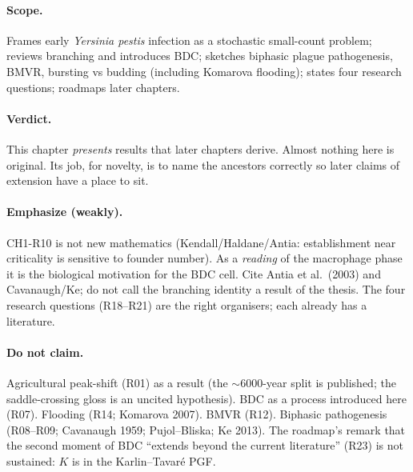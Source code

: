\documentclass[11pt,a4paper]{report}
\newcommand{\yp}{\textit{Yersinia pestis}}
\begin{document}
\paragraph{Scope.}
Frames early \yp{} infection as a stochastic small-count problem; reviews
branching and introduces BDC; sketches biphasic plague pathogenesis,
BMVR, bursting vs budding (including Komarova flooding); states four
research questions; roadmaps later chapters.

\paragraph{Verdict.}
This chapter \emph{presents} results that later chapters derive. Almost
nothing here is original. Its job, for novelty, is to name the ancestors
correctly so later claims of extension have a place to sit.

\paragraph{Emphasize (weakly).}
CH1-R10 is not new mathematics (Kendall/Haldane/Antia: establishment near
criticality is sensitive to founder number). As a \emph{reading} of the
macrophage phase it is the biological motivation for the BDC cell. Cite
Antia et al.\ (2003) and Cavanaugh/Ke; do not call the branching identity
a result of the thesis. The four research questions (R18--R21) are the
right organisers; each already has a literature.

\paragraph{Do not claim.}
Agricultural peak-shift (R01) as a result (the \(\sim 6000\)-year split
is published; the saddle-crossing gloss is an uncited hypothesis). BDC as
a process introduced here (R07). Flooding (R14; Komarova 2007). BMVR
(R12). Biphasic pathogenesis (R08--R09; Cavanaugh 1959; Pujol--Bliska;
Ke 2013). The roadmap's remark that the second moment of BDC ``extends
beyond the current literature'' (R23) is not sustained: \(K\) is in the
Karlin--Tavar\'e PGF.
\end{document}
